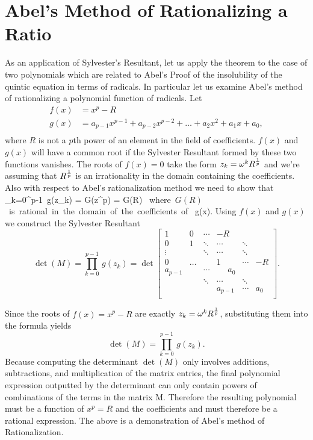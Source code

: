 
\section{Abel's Method of Rationalizing a Ratio} As an application of Sylvester's Resultant, let us apply the theorem to the case of two polynomials which are related to Abel's Proof of the 
insolubility of the quintic equation in terms of radicals. In particular let us examine Abel's method of rationalizing a polynomial function of radicals.
Let 
\begin{align*}
f(x)  &= x^{p} - R\\
g(x) &=  a_{p-1} x^{p-1}  + a_{p-2} x^{p-2} + \hdots + a_2 x^2 + a_1 x   + a_0,  \\
\end{align*} where $R$ is not a $p$th power of an element in the field of coefficients. 
$f(x)$ and $g(x)$ will have a common root if the Sylvester Resultant formed by these two functions vanishes. 
The roots of $f(x) = 0$ take the form $z_k = \omega^k R^{1\over p}$ and we're assuming that $R^{1\over p}$ is an irrationality in the domain containing the coefficients. 
Also with respect to Abel's rationalization method 
we need to show that 
\be \prod_{k=0}^{p-1}\, g(z_k) = G(z^p)  = G(R)  \mbox{  where $G(R)$ is rational in the domain of the coefficients of } g(x).\ee
Using $f(x)$ and $g(x)$ we construct the Sylvester Resultant
\[\det(M) = \prod_{k=0}^{p-1}\, g(z_k)  =
\det \begin{bmatrix}
1     & 0 & \cdots  & -R                   &            &    \\
 0    &  1 & \ddots & \cdots               & \ddots  &    \\
 \vdots  &  & \ddots & \cdots               & \ddots  &    \\
 0      &  \hdots   &            & 1                       & \cdots  & -R\\
a_{p-1} &     & \cdots & ~~~~~~a_0 &             & \\
       &     & \ddots & \cdots                & \ddots & \\
       &     &            &a_{p-1}                     & \cdots &a_0 \\
\end{bmatrix}.\]

Since the roots of $f(x) = x^p - R $ are exactly $z_k = \omega^k R^{1\over p}$, substituting them into the formula yields 
\[ \det(M) =  \prod_{k=0}^{p-1}\, g(z_k) .\] 
Because computing the determinant $\det(M)$ only involves additions, subtractions, and multiplication of the matrix entries, the 
final polynomial expression outputted by the determinant can only contain powers of combinations of the terms in the matrix M. 
Therefore the resulting polynomial must be a function of $x^p = R$ and the coefficients and must therefore be a rational expression. 
The above is a demonstration of Abel's method of Rationalization. 